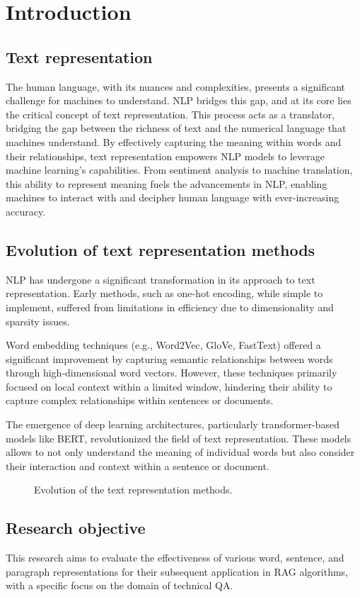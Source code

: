 
\chapter{Introduction\label{chap:introduction}}

\section{Text representation}
The human language, with its nuances and complexities, presents a significant challenge for machines to understand.
\ac{NLP} bridges this gap, and at its core lies the critical concept of text representation.
This process acts as a translator, bridging the gap between the richness of text and the numerical language that machines understand.
By effectively capturing the meaning within words and their relationships, text representation empowers \ac{NLP} models to leverage machine learning's capabilities.
From sentiment analysis to machine translation, this ability to represent meaning fuels the advancements in \ac{NLP}, enabling machines to interact with and decipher human language with ever-increasing accuracy.

\section{Evolution of text representation methods}

\ac{NLP} has undergone a significant transformation in its approach to text representation.
Early methods, such as one-hot encoding, while simple to implement, suffered from limitations in efficiency due to dimensionality and sparsity issues.

Word embedding techniques (e.g., Word2Vec, \ac{GloVe}, FastText) offered a significant improvement by capturing semantic relationships between words through high-dimensional word vectors.
However, these techniques primarily focused on local context within a limited window, hindering their ability to capture complex relationships within sentences or documents.

The emergence of deep learning architectures, particularly transformer-based models like \ac{BERT}, revolutionized the field of text representation.
These models allows to not only understand the meaning of individual words but also consider their interaction and context within a sentence or document.

\begin{figure}
  \centering
    
  \caption{Evolution of the text representation methods.}
  \label{fig:ecolution_text_representation}
\end{figure}

\section{Research objective}

This research aims to evaluate the effectiveness of various word, sentence, and paragraph representations for their subsequent application in \ac{RAG} algorithms, with a specific focus on the domain of technical \ac{QA}.